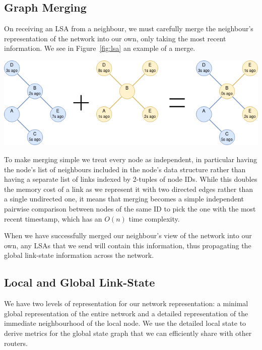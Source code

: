 \documentclass[withindex,glossary,openany]{cam-thesis}
\begin{document}
\subsection{Graph Merging}

On receiving an LSA from a neighbour, we must carefully merge the neighbour's representation of the network into our own, only taking the most recent information. We see in Figure~\ref{fig:lsa} an example of a merge.

\begin{center}
\begin{minipage}{0.9\textwidth} \centering
	\includegraphics[width=1\textwidth]{lsa}
	\label{fig:lsa}
\end{minipage}
\end{center}

To make merging simple we treat every node as independent, in particular having the node's list of neighbours included in the node's data structure rather than having a separate list of links indexed by 2-tuples of node IDs. While this doubles the memory cost of a link as we represent it with two directed edges rather than a single undirected one, it means that merging becomes a simple independent pairwise comparison between nodes of the same ID to pick the one with the most recent timestamp, which has an $O(n)$ time complexity.

When we have successfully merged our neighbour's view of the network into our own, any LSAs that we send will contain this information, thus propagating the global link-state information across the network.

\subsection{Local and Global Link-State}

We have two levels of representation for our network representation: a minimal global representation of the entire network and a detailed representation of the immediate neighbourhood of the local node. We use the detailed local state to derive metrics for the global state graph that we can efficiently share with other routers.
\end{document}
